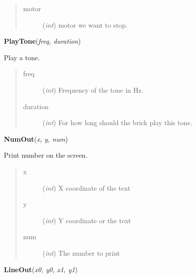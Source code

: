 \documentclass[10pt,a4paper]{article}
\begin{document}
    

\begin{quote}
    \begin{description}
        
\item[motor] ({\emph{int}}) motor we want to stop.

    \end{description}
\end{quote}

 

\vspace{6pt}
{\bf PlayTone}({\it freq, duration}) 
    
    Play a tone.



    

\begin{quote}
    \begin{description}
        
\item[freq] ({\emph{int}}) Frequency of the tone in Hz.

\item[duration] ({\emph{int}}) For how long should the brick play this tone. 

    \end{description}
\end{quote}

 

\vspace{6pt}
{\bf NumOut}({\it x, y, num}) 
    
    Print number on the screen.
 



    

\begin{quote}
    \begin{description}
        
\item[x] ({\emph{int}}) X coordinate of the text

\item[y] ({\emph{int}}) Y coordinate or the text

\item[num] ({\emph{int}}) The number to print

    \end{description}
\end{quote}

 

\vspace{6pt}
{\bf LineOut}({\it x0, y0, x1, y1}) 
    
\end{document}
